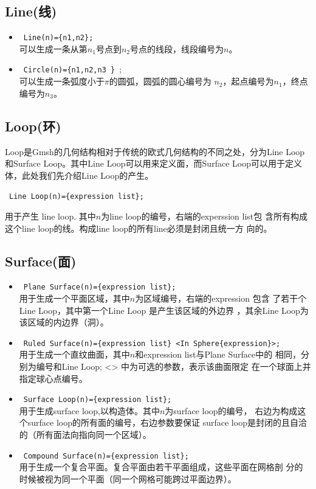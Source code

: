 \documentclass[a4paper,  11pt]{ctexart}
\begin{document}
\subsection{Line(线)}
\begin{itemize}
		\item 
~\verb|Line(n)={n1,n2};|~ \\
可以生成一条从第$n_1$号点到$n_2$号点的线段，线段编号为$n$。
\item 
	~\verb|Circle(n)={n1,n2,n3 }|~;  \\
	可以生成一条弧度小于$\pi$的圆弧，圆弧的圆心编号为
	$n_2$，起点编号为$n_1$，终点编号为$n_3$。
\end{itemize}
\subsection{Loop(环)}
Loop是Gmsh的几何结构相对于传统的欧式几何结构的不同之处，分为Line Loop
和Surface Loop。其中Line Loop可以用来定义面，而Surface Loop可以用于定义
体，此处我们先介绍Line Loop的产生。\par
~\verb|Line Loop(n)={expression list};|~ \par
用于产生 line loop. 其中$n$为line loop的编号，右端的experssion list包
含所有构成这个line loop的线。构成line loop的所有line必须是封闭且统一方
向的。
\subsection{Surface(面)}
\begin{itemize}
	\item ~\verb|Plane Surface(n)={expression list};|~ \\
		用于生成一个平面区域，其中$n$为区域编号，右端的expression 包含
		了若干个Line Loop，其中第一个Line Loop 是产生该区域的外边界
		，其余Line Loop为该区域的内边界（洞）。
\item ~\verb|Ruled Surface(n)={expression list} <In	Sphere{expression}>;|~ \\
		用于生成一个直纹曲面，其中$n$和expression list与Plane Surface中的
		相同，分别为编号和Line Loop; <> 中为可选的参数，表示该曲面限定
		在一个球面上并指定球心点编号。
	\item ~\verb|Surface Loop(n)={expression list};|~ \\
		用于生成surface loop,以构造体。其中$n$为surface loop的编号，
		右边为构成这个surface loop的所有面的编号，右边参数要保证
		surface loop是封闭的且自洽的（所有面法向指向同一个区域）。
	\item ~\verb|Compound Surface(n)={expression list};|~ \\
		用于生成一个复合平面。复合平面由若干平面组成，这些平面在网格剖
		分的时候被视为同一个平面（同一个网格可能跨过平面边界）。
\end{itemize}
\end{document}
